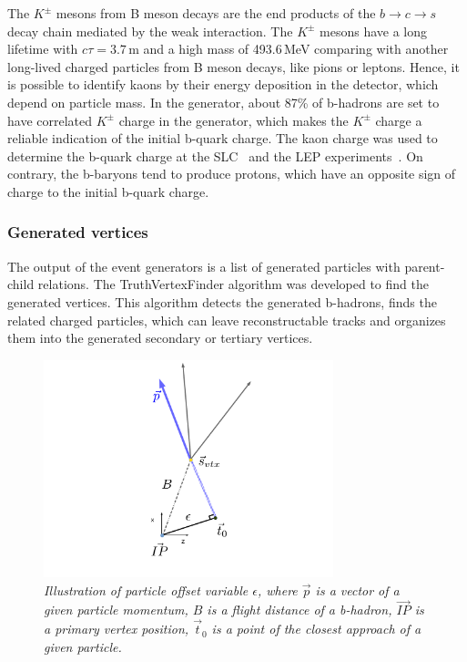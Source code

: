 The $K^\pm$ mesons from B meson decays are the end products of the $b\to c\to s$ decay chain mediated by the weak interaction. 
The $K^\pm$ mesons have a long lifetime with $c\tau = 3.7$\,m and a high mass of 493.6\,MeV comparing with another long-lived charged particles from B meson decays, like pions or leptons. 
Hence, it is possible to identify kaons by their energy deposition in the detector, which depend on particle mass. 
In the generator, about 87\% of b-hadrons are set to have correlated $K^\pm$ charge in the generator, which makes the $K^\pm$ charge a reliable indication of the initial b-quark charge. The kaon charge was used to determine the b-quark charge at the SLC~\cite{Falciai:1996jv} and the LEP experiments~\cite{Abreu:1999ui}.
On contrary, the b-baryons tend to produce protons, which have an opposite sign of charge to the initial b-quark charge.

\subsubsection{Generated vertices}
The output of the event generators is a list of generated particles with parent-child relations. 
The TruthVertexFinder algorithm was developed to find the generated vertices.%
This algorithm detects the generated b-hadrons, finds the related charged particles, which can leave reconstructable tracks and organizes them into the generated secondary or tertiary vertices.
\begin{figure}
	{\centering
		\includegraphics[width=0.75\textwidth]{ILD/plots/offset-graph.pdf}
		\caption{\sl Illustration of particle offset variable $\epsilon$, where $\vec{p}$ is a vector of a given particle momentum, $B$ is a flight distance of a b-hadron, $\vec{IP}$ is a primary vertex position, $\vec{t}_0$ is a point of the closest approach of a given particle. 
		}
		\label{fig:OffsetPic_3}
	}
\end{figure}



